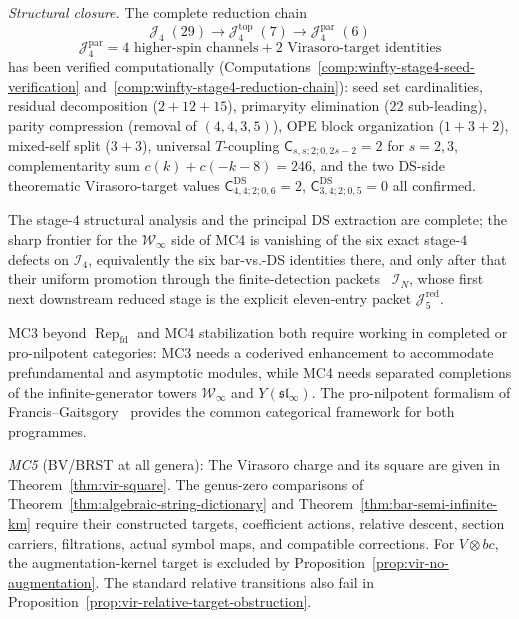 \begin{remark}
\begin{remark}
\emph{Structural closure.}
The complete reduction chain
\[
\mathcal{J}_4\;(29) \to \mathcal{J}_4^{\mathrm{top}}\;(7)
\to \mathcal{J}_4^{\mathrm{par}}\;(6)
\]
\[
\mathcal{J}_4^{\mathrm{par}}
= 4\text{ higher-spin channels} + 2\text{ Virasoro-target identities}
\]
has been verified computationally
(Computations~\ref{comp:winfty-stage4-seed-verification}
and~\ref{comp:winfty-stage4-reduction-chain}):
seed set cardinalities, residual decomposition ($2+12+15$),
primaryity elimination ($22$ sub-leading), parity compression
(removal of $(4,4,3,5)$), OPE block organization ($1+3+2$),
mixed-self split ($3+3$), universal $T$-coupling
$\mathsf{C}_{s,s;2;0,2s-2}=2$ for $s=2,3$, complementarity sum
$c(k)+c(-k-8)=246$, and the two DS-side
theorematic Virasoro-target values
$\mathsf{C}^{\mathrm{DS}}_{4,4;2;0,6}=2$,
$\mathsf{C}^{\mathrm{DS}}_{3,4;2;0,5}=0$ all confirmed.

The stage-$4$ structural analysis and the principal DS extraction are
complete; the sharp frontier for the $\mathcal{W}_\infty$ side of MC4
is vanishing of the six exact stage-$4$ defects on $\mathcal{I}_4$,
equivalently the six bar-vs.-DS identities there, and only after that
their uniform promotion through the finite-detection packets
~$\mathcal{I}_N$, whose first next downstream reduced stage is the
explicit eleven-entry packet $\mathcal{J}_5^{\mathrm{red}}$.
\end{remark}

\begin{remark}
\label{rem:mc3-mc4-shared-completion}
MC3 beyond $\operatorname{Rep}_{\mathrm{fd}}$ and MC4 stabilization
both require working in completed or pro-nilpotent categories: MC3
needs a coderived enhancement to accommodate prefundamental and
asymptotic modules, while MC4 needs separated completions of the
infinite-generator towers $\mathcal{W}_\infty$ and $Y(\mathfrak{sl}_\infty)$.
The pro-nilpotent formalism of Francis--Gaitsgory~\cite{FG12} provides
the common categorical framework for both programmes.
\end{remark}

\emph{MC5} (BV/BRST at all genera):
The Virasoro charge and its square are given in Theorem~\ref{thm:vir-square}.
The genus-zero comparisons of Theorem~\ref{thm:algebraic-string-dictionary} and Theorem~\ref{thm:bar-semi-infinite-km} require their constructed targets, coefficient actions, relative descent, section carriers, filtrations, actual symbol maps, and compatible corrections.
For $V\otimes bc$, the augmentation-kernel target is excluded by Proposition~\ref{prop:vir-no-augmentation}.
The standard relative transitions also fail in Proposition~\ref{prop:vir-relative-target-obstruction}.


\end{remark}
